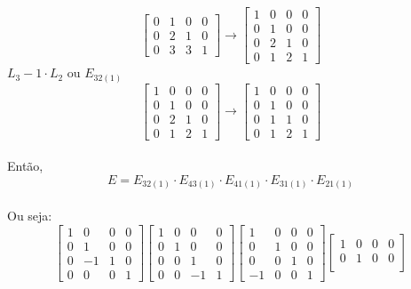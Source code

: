 \documentclass[leqno]{article}
\begin{document}
\begin{enumerate}
\begin{sol}
$$\begin{bmatrix}
				0 & 1 & 0 & 0 \\
				0 & 2 & 1 & 0 \\
				0 & 3 & 3 & 1 
			\end{bmatrix} \rightarrow 
			\begin{bmatrix} 
				1 & 0 & 0 & 0 \\
				0 & 1 & 0 & 0 \\
				0 & 2 & 1 & 0 \\
				0 & 1 & 2 & 1 
			\end{bmatrix}$$
			$L_3 - 1 \cdot L_2$ ou $E_{32(1)}$ \\
			$$	\begin{bmatrix} 
				1 & 0 & 0 & 0 \\
				0 & 1 & 0 & 0 \\
				0 & 2 & 1 & 0 \\
				0 & 1 & 2 & 1 
			\end{bmatrix} \rightarrow 
			\begin{bmatrix} 
				1 & 0 & 0 & 0 \\
				0 & 1 & 0 & 0 \\
				0 & 1 & 1 & 0 \\
				0 & 1 & 2 & 1 
			\end{bmatrix}$$\\
		Então, $$E = E_{32(1)} \cdot E_{43(1)} \cdot E_{41(1)} \cdot E_{31(1)} \cdot E_{21(1)}$$\\
		Ou seja:\\
		$$	\begin{bmatrix} 
			1 & 0 & 0 & 0 \\
			0 & 1 & 0 & 0 \\
			0 & -1 & 1 & 0 \\
			0 & 0 & 0 & 1 
		\end{bmatrix} 
		\begin{bmatrix} 
			1 & 0 & 0 & 0 \\
			0 & 1 & 0 & 0 \\
			0 & 0 & 1 & 0 \\
			0 & 0 & -1 & 1 
		\end{bmatrix}
		\begin{bmatrix} 
			1 & 0 & 0 & 0 \\
			0 & 1 & 0 & 0 \\
			0 & 0 & 1 & 0 \\
			-1 & 0 & 0 & 1 
		\end{bmatrix}
		\begin{bmatrix} 
			1 & 0 & 0 & 0 \\
			0 & 1 & 0 & 0 \\

\end{bmatrix}$$
\end{sol}
\end{enumerate}
\end{document}
